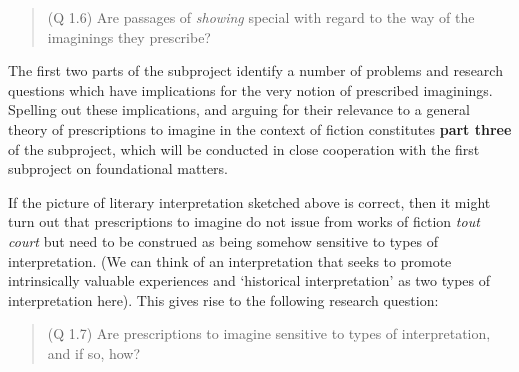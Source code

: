\vspace{-.2cm}
\begin{quote}
(Q 1.6) Are passages of \emph{showing} special with regard to the way
of the imaginings they prescribe?
\end{quote}
\vspace{-.2cm}

\noindent The first two parts of the subproject identify a number of problems and
research questions which have implications for the very notion of
prescribed imaginings. Spelling out these implications, and arguing for
their relevance to a general theory of prescriptions to imagine in the
context of fiction constitutes \textbf{part three} of the subproject,
which will be conducted in close cooperation with the {first subproject
on foundational matters}.

 If the picture of literary interpretation sketched above is correct,
then it might turn out that prescriptions to imagine do not issue from
works of fiction \emph{tout court} but need to be construed as being
somehow sensitive to types of interpretation. (We can think of an
interpretation that seeks to promote intrinsically valuable experiences
and `historical interpretation' as two types of interpretation here).
This gives rise to the following research question:

\vspace{-.2cm}
\begin{quote}
(Q 1.7)  Are prescriptions to imagine sensitive to types of
interpretation, and if so, how?
\end{quote}
\vspace{-.2cm}

